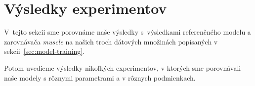 




\section{Výsledky experimentov}
V~tejto sekcii sme porovnáme naše výsledky s~výsledkami referenčného modelu a zarovnávača \textit{muscle} \cite{edgar2004muscle} na našich troch dátových množinách popísaných v sekcii~\ref{sec:model-training}.

Potom uvedieme výsledky nikoľkých experimentov, v ktorých sme porovnávali naše modely s rôznymi parametrami a v rôznych podmienkach.

